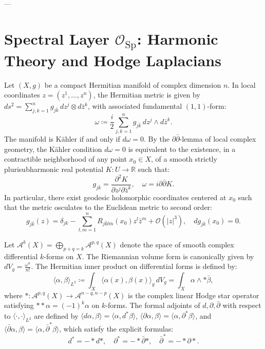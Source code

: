 \documentclass[11pt,a4paper]{article}
\theoremstyle{definition}
\theoremstyle{plain}
\begin{document}
---

\section{Spectral Layer $\mathcal{O}_{\mathrm{Sp}}$: Harmonic Theory and Hodge Laplacians}
\label{sec:spectral}

Let $(X, g)$ be a compact Hermitian manifold of complex dimension $n$. In local coordinates $z = (z^1, \dots, z^n)$, the Hermitian metric is given by $ds^2 = \sum_{j,k=1}^n g_{j\bar{k}} \, dz^j \otimes d\bar{z}^k$, with associated fundamental $(1,1)$-form:
\begin{equation}
    \label{eq:fundamental_two_form}
    \omega \coloneqq \frac{i}{2} \sum_{j,k=1}^n g_{j\bar{k}} \, dz^j \wedge d\bar{z}^k.
\end{equation}
The manifold is Kähler if and only if $d\omega = 0$. By the $\partial\bar{\partial}$-lemma of local complex geometry, the Kähler condition $d\omega = 0$ is equivalent to the existence, in a contractible neighborhood of any point $x_0 \in X$, of a smooth strictly plurisubharmonic real potential $K: U \to \mathbb{R}$ such that:
\begin{equation}
    \label{eq:local_kahler_potential}
    g_{j\bar{k}} = \frac{\partial^2 K}{\partial z^j \partial \bar{z}^k}, \quad \omega = i \partial \bar{\partial} K.
\end{equation}
In particular, there exist geodesic holomorphic coordinates centered at $x_0$ such that the metric osculates to the Euclidean metric to second order:
\begin{equation}
    \label{eq:osculating_coordinates}
    g_{j\bar{k}}(z) = \delta_{jk} - \sum_{l,m=1}^n R_{j\bar{k}l\bar{m}}(x_0) z^l \bar{z}^m + \mathcal{O}(|z|^3), \quad dg_{j\bar{k}}(x_0) = 0.
\end{equation}

Let $\mathcal{A}^k(X) = \bigoplus_{p+q=k} \mathcal{A}^{p,q}(X)$ denote the space of smooth complex differential $k$-forms on $X$. The Riemannian volume form is canonically given by $dV_g = \frac{\omega^n}{n!}$. The Hermitian inner product on differential forms is defined by:
\begin{equation}
    \label{eq:hermitian_inner_product_forms}
    \langle\alpha, \beta\rangle_{L^2} \coloneqq \int_X \langle\alpha(x), \beta(x)\rangle_g \, dV_g = \int_X \alpha \wedge * \bar{\beta},
\end{equation}
where $*: \mathcal{A}^{p,q}(X) \to \mathcal{A}^{n-q, n-p}(X)$ is the complex linear Hodge star operator satisfying $* * \alpha = (-1)^k \alpha$ on $k$-forms. The formal adjoints of $d, \partial, \bar{\partial}$ with respect to $\langle\cdot, \cdot\rangle_{L^2}$ are defined by $\langle d\alpha, \beta\rangle = \langle\alpha, d^*\beta\rangle$, $\langle \partial\alpha, \beta\rangle = \langle\alpha, \partial^*\beta\rangle$, and $\langle \bar{\partial}\alpha, \beta\rangle = \langle\alpha, \bar{\partial}^*\beta\rangle$, which satisfy the explicit formulas:
\begin{equation}
    d^* = -* d *, \quad \partial^* = -* \bar{\partial} *, \quad \bar{\partial}^* = -* \partial *.
\end{equation}
\end{document}
